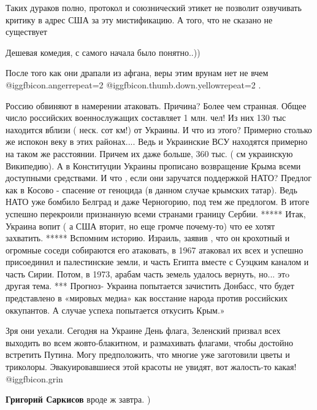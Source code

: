 \begin{itemize}

Таких дураков полно, протокол и союзнический этикет не позволит озвучивать
критику в адрес США за эту мистификацию. А того, что не сказано не существует

Дешевая комедия, с самого начала было понятно..))


После того как они драпали из афгана, веры этим врунам нет не вчем
@igg{fbicon.anger}{repeat=2}  @igg{fbicon.thumb.down.yellow}{repeat=2} .


Россию обвиняют в намерении атаковать. Причина? Более чем странная. Общее число
российских военнослужащих составляет 1 млн. чел! Из них 130 тыс находится
вблизи ( неск. сот км!) от Украины. И что из этого? Примерно столько же испокон
веку в этих районах.... Ведь и Украинские ВСУ находятся примерно на таком же
расстоянии. Причем их даже больше, 360 тыс. ( см украинскую Википедию). А в
Конституции Украины прописано возвращение Крыма всеми доступными средствами. И
что , если они заручатся поддержкой НАТО? Предлог как в Косово - спасение от
геноцида (в данном случае крымских татар). Ведь НАТО уже бомбило Белград и даже
Черногорию, под тем же предлогом. В итоге успешно перекроили признанную всеми
странами границу Сербии. ***** Итак, Украина вопит ( а США вторит, но еще
громче почему-то) что ее хотят захватить. ***** Вспомним историю. Израиль,
заявив , что он крохотный и огромные соседи собираются его атаковать, в 1967
атаковал их всех и успешно присоединил и палестинские земли, и часть Египта
вместе с Суэцким каналом и часть Сирии. Потом, в 1973, арабам часть земель
удалось вернуть, но... этo другая тема. *** Прогноз- Украина попытается зачистить
Донбасс, что будет представлено в «мировых медиа» как восстание народа против
российских оккупантов. А случае успеха попытается откусить Крым.»


Зря они уехали. Сегодня на Украине День флага, Зеленский призвал всех выходить
во всем жовто-блакитном, и размахивать флагами, чтобы достойно встретить
Путина. Могу предположить, что многие уже заготовили цветы и триколоры.
Эвакуировавшиеся этой красоты не увидят, вот жалость-то какая!  @igg{fbicon.grin} 

\begin{itemize} %
\textbf{Григорий Саркисов} вроде ж завтра. )


\end{itemize}
\end{itemize}
